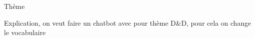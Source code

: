 Thème

	Explication, on veut faire un chatbot avec pour thème D\&D, pour cela on change le vocabulaire
